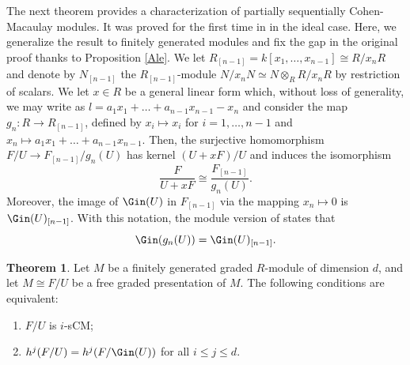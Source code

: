 \documentclass[12pt]{amsart}
\theoremstyle{definition}
\newtheorem{theorem}{Theorem}[section]
\theoremstyle{definition}
\renewcommand{\leq}{\leqslant}
\let\:=\colon
\begin{document}
 The next theorem provides a characterization of partially sequentially Cohen-Macaulay modules. It was proved for the first time in \cite[Theorem 3.5]{SS17} in the ideal case. Here, we generalize the result to finitely generated modules and fix the gap in the original proof thanks to Proposition \ref{Ale}. We let $R_{[n-1]}=k[x_1, \dots, x_{n-1}] \cong R/x_nR$ and denote by $N_{[n-1]}$ the $R_{[n-1]}$-module $N/x_n N \simeq N  \otimes_R R/x_nR$ by restriction of scalars. We let $x\in R$ be a general linear form which, without loss of generality, we may write as $l=a_1x_1 + \dots + a_{n-1}x_{n-1}-x_n$ and consider the map $g_n\: R \to R_{[n-1]}$, defined by $x_i\mapsto x_i$ for $i=1,\ldots,n-1$ and $x_n\mapsto a_1x_1 + \dots + a_{n-1}x_{n-1}$. Then, the surjective homomorphism $F/U \rightarrow F_{[n-1]}/g_n(U)$
has kernel $(U+xF)/U$ and induces the isomorphism  
\begin{equation}\label{generic}
\frac{F}{U+xF} \cong \frac{F_{[n-1]}}{g_n(U)}.
\end{equation}
Moreover, the image of $\Gin(U)$ in $F_{[n-1]}$ via the mapping $x_n \mapsto 0$ is $\Gin(U)_{[n-1]}$. With this notation, the module version of \cite[Corollary 2.15]{Gre98} states that 
\begin{equation}\label{215}
\Gin(g_n(U))=\Gin(U)_{[n-1]}.
\end{equation}

\begin{theorem}\label{partiallySCM}
Let $M$ be a finitely generated graded $R$-module of dimension $d$, and let $M \cong F/U$ be a free graded presentation of $M$. The following conditions are equivalent:
\begin{enumerate}[(1)]
\item $F/U$ is $i$-sCM;
\item $h^j(F/U)=h^j(F/\Gin(U))$ for all $i\leq j\leq d$.
\end{enumerate}
\end{theorem}
\end{document}
